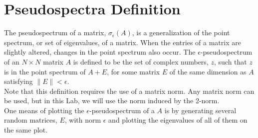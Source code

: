 \label{lab:pseudospectra}



\section*{Pseudospectra Definition}

The pseudospectrum of a matrix, $\sigma _{\epsilon}(A)$, is a generalization of the point spectrum, or set of eigenvalues, of a matrix. When the entries of a matrix are slightly altered, changes in the point spectrum also occur. The $\epsilon$-pseudospectrum of an $N\times N$ matrix $A$ is defined to be the set of complex numbers, $z$, such that $z$ is in the point spectrum of $A+E$, for some matrix $E$ of the same dimension as $A$ satisfying $\lVert E \rVert < \epsilon$.\\

Note that this definition requires the use of a matrix norm. Any matrix norm can be used, but in this Lab, we will use the norm induced by the 2-norm.\\

One means of plotting the $\epsilon$-pseudospectrum of a $A$ is by generating several random matrices, $E$, with norm $\epsilon$ and plotting the eigenvalues of all of them on the same plot.\\

